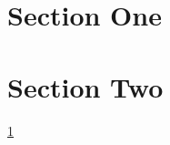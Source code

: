\documentclass{article}
\begin{document}
\section{Section One}\label{sec:one}
\section{Section Two}\ref{sec:one}
\end{document}
